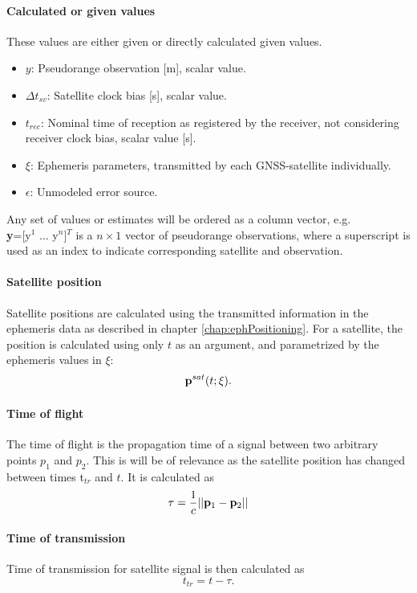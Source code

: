 \paragraph{Calculated or given values}
These values are either given or directly calculated given values.
\begin{itemize}
\item $y$: Pseudorange observation [m], scalar value.
\item $\Delta t_{sv}$: Satellite clock bias [s], scalar value.
\item $t_{rec}$: Nominal time of reception as registered by the receiver, not considering receiver clock bias, scalar value [s].
\item $\xi$: Ephemeris parameters, transmitted by each GNSS-satellite individually.
\item $\epsilon$: Unmodeled error source.
\end{itemize}
Any set of values or estimates will be ordered as a column vector, e.g. \\ \textbf{y}=[y$^1$ ... y$^n$]$^T$ is a $n\times1$ vector of pseudorange observations, where a superscript is used as an index to indicate corresponding satellite and observation. 

\paragraph{Satellite position}
Satellite positions are calculated using the transmitted information in the ephemeris data as described in chapter \ref{chap:ephPositioning}. For a satellite, the position is calculated using only $t$ as an argument, and parametrized by the ephemeris values in $\xi$:
\begin{equation}\label{eq:p_sat}
{\bf p}^{sat}(t; \xi).
\end{equation}
\paragraph{Time of flight}
The time of flight is the propagation time of a signal between two arbitrary points $p_1$ and $p_2$. This is will be of relevance as the satellite position has changed between times t$_{tr}$ and $t$. It is calculated as
\begin{equation}\label{eq:tof}
\tau=\frac{1}{c}||{\bf p}_1-{\bf p}_2||
\end{equation}
\paragraph{Time of transmission}
Time of transmission for satellite signal is then calculated as 
\begin{equation}
t_{tr}=t-\tau.
\end{equation}
